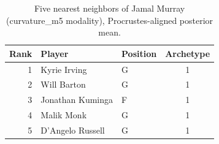 \begin{table}[htbp]
  \centering\small
  \begin{tabular}{rllc}
    \toprule
    Rank & Player & Position & Archetype \\
    \midrule
    1 & Kyrie Irving & G & 1 \\
    2 & Will Barton & G & 1 \\
    3 & Jonathan Kuminga & F & 1 \\
    4 & Malik Monk & G & 1 \\
    5 & D'Angelo Russell & G & 1 \\
    \bottomrule
  \end{tabular}
  \caption{Five nearest neighbors of Jamal Murray (curvature_m5 modality), Procrustes-aligned posterior mean.}
  \label{tab:Jamal_Murray_neighbors_curvature_m5}
\end{table}

